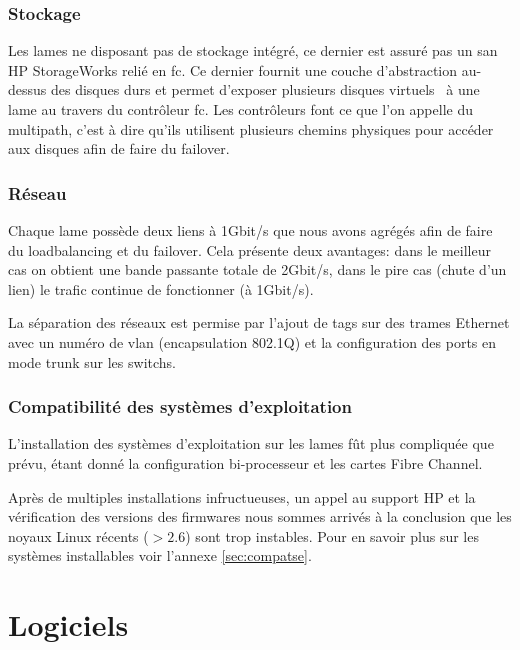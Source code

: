 \documentclass[a4paper,oneside]{report}
\begin{document}
\subsection{Stockage}
Les lames ne disposant pas de stockage intégré, ce dernier est assuré pas un \gls{san} HP StorageWorks relié en \gls{fc}.
Ce dernier fournit une couche d'abstraction au-dessus des disques durs et permet d'exposer plusieurs disques \og virtuels \fg~à une lame au travers du contrôleur \gls{fc}.\newline
Les contrôleurs font ce que l'on appelle du \gls{multipath}, c'est à dire qu'ils utilisent plusieurs chemins physiques pour accéder aux disques afin de faire du \gls{failover}.

\subsection{Réseau}
Chaque lame possède deux liens à 1Gbit/s que nous avons agrégés afin de faire du \gls{loadbalancing} et du \gls{failover}. Cela présente deux avantages: dans le meilleur cas on obtient une bande passante totale de 2Gbit/s, dans le pire cas (chute d'un lien) le trafic continue de fonctionner (à 1Gbit/s).

La séparation des réseaux est permise par l'ajout de tags sur des trames Ethernet avec un numéro de \gls{vlan} (encapsulation 802.1Q) et la configuration des ports en mode trunk sur les \glspl{switch}.

\subsection{Compatibilité des systèmes d'exploitation}
L'installation des systèmes d'exploitation sur les lames fût plus compliquée que prévu, étant donné la configuration bi-processeur et les cartes Fibre Channel.

Après de multiples installations infructueuses, un appel au support HP et la vérification des versions des firmwares nous sommes arrivés à la conclusion que les noyaux Linux récents ($ > 2.6 $) sont trop instables. Pour en savoir plus sur les systèmes installables voir l'annexe \ref{sec:compatse}.

\chapter{Logiciels}
\end{document}
